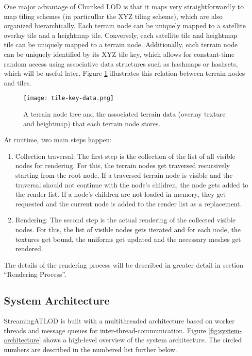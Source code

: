 One major advantage of Chunked LOD is that it maps very straightforwardly to map tiling schemes (in particullar the XYZ tiling scheme), which are also
organized hierarchically. Each terrain node can be uniquely mapped to a satellite overlay tile and a heightmap tile.
Conversely, each satellite tile and heightmap tile can be uniquely mapped to a terrain node.
Additionally, each terrain node can be uniquely identified by its XYZ tile key, which allows for 
constant-time random access using associative data structures such as hashmaps or hashsets,
which will be useful later. Figure \ref{fig:tile-data} 
illustrates this relation between terrain nodes and tiles.

\begin{figure}[H]
  \centering
  \texttt{[image: tile-key-data.png]}
  \caption{A terrain node tree and the associated terrain data (overlay texture and heightmap) that each terrain node stores.}\label{fig:tile-data}
\end{figure}

At runtime, two main steps happen:
\begin{enumerate}
  \item Collection traversal: The first step is the collection of the list of all visible nodes for rendering.
  For this, the terrain nodes get traversed recursively starting from the root node.
  If a traversed terrain node is visible and the traversal should not continue with the node's children,
  the node gets added to the render list. If a node's children are not loaded in memory,
  they get requested and the current node is added to the render list as a replacement.
  \item Rendering: The second step is the actual rendering of the collected visible nodes.
  For this, the list of visible nodes gets iterated and for each node,
  the textures get bound,
  the uniforms get updated and the necessary meshes get rendered.
\end{enumerate}
The details of the rendering process will be described in greater 
detail in section ``Rendering Process''.

\subsection{System Architecture}
StreamingATLOD is built with a multithreaded architecture 
based on worker threads and message queues for inter-thread-communication.
Figure \ref{fig:system-architecture} shows a high-level overview of the system architecture.
The circled numbers are described in the numbered list further below.

